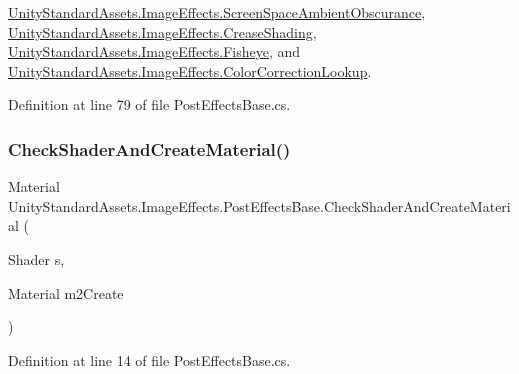 \mbox{\hyperlink{class_unity_standard_assets_1_1_image_effects_1_1_screen_space_ambient_obscurance_aa05dd1fc7e3faf1cee9c5bc09e840434}{Unity\+Standard\+Assets.\+Image\+Effects.\+Screen\+Space\+Ambient\+Obscurance}}, \mbox{\hyperlink{class_unity_standard_assets_1_1_image_effects_1_1_crease_shading_a66866d2b64013cd8e1931a9d0e19f101}{Unity\+Standard\+Assets.\+Image\+Effects.\+Crease\+Shading}}, \mbox{\hyperlink{class_unity_standard_assets_1_1_image_effects_1_1_fisheye_aab758a8fa12b52a196cec8cdd9e66c03}{Unity\+Standard\+Assets.\+Image\+Effects.\+Fisheye}}, and \mbox{\hyperlink{class_unity_standard_assets_1_1_image_effects_1_1_color_correction_lookup_a509c6ad96fc5b0d58ac768c076bd84cf}{Unity\+Standard\+Assets.\+Image\+Effects.\+Color\+Correction\+Lookup}}.



Definition at line 79 of file Post\+Effects\+Base.\+cs.

\mbox{\label{class_unity_standard_assets_1_1_image_effects_1_1_post_effects_base_aaf026c79c57ca6862aab5d0fd0aa6cc6}} 
\subsubsection{\texorpdfstring{Check\+Shader\+And\+Create\+Material()}{CheckShaderAndCreateMaterial()}}
{\footnotesize\ttfamily Material Unity\+Standard\+Assets.\+Image\+Effects.\+Post\+Effects\+Base.\+Check\+Shader\+And\+Create\+Material (\begin{DoxyParamCaption}\item[{Shader}]{s,  }\item[{Material}]{m2\+Create }\end{DoxyParamCaption})\hspace{0.3cm}{\ttfamily [protected]}}



Definition at line 14 of file Post\+Effects\+Base.\+cs.

\mbox{\label{class_unity_standard_assets_1_1_image_effects_1_1_post_effects_base_ad8aac442bf04a0767c8060bbd290ecee}} 
